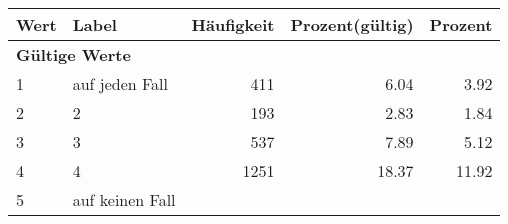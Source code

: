      \begin{longtable}{lXrrr}
     \toprule
     \textbf{Wert} & \textbf{Label} & \textbf{Häufigkeit} & \textbf{Prozent(gültig)} & \textbf{Prozent} \\
     \endhead
     \midrule
     \multicolumn{5}{l}{\textbf{Gültige Werte}}\\

     1 &
     \multicolumn{1}{X}{ auf jeden Fall   } &


       \num{411} &
       \num[round-mode=places,round-precision=2]{6.04} &
         \num[round-mode=places,round-precision=2]{3.92} \\

     2 &
     \multicolumn{1}{X}{ 2   } &


       \num{193} &
       \num[round-mode=places,round-precision=2]{2.83} &
         \num[round-mode=places,round-precision=2]{1.84} \\

     3 &
     \multicolumn{1}{X}{ 3   } &


       \num{537} &
       \num[round-mode=places,round-precision=2]{7.89} &
         \num[round-mode=places,round-precision=2]{5.12} \\

     4 &
     \multicolumn{1}{X}{ 4   } &


       \num{1251} &
       \num[round-mode=places,round-precision=2]{18.37} &
         \num[round-mode=places,round-precision=2]{11.92} \\

     5 &
     \multicolumn{1}{X}{ auf keinen Fall   } &



\end{longtable}
